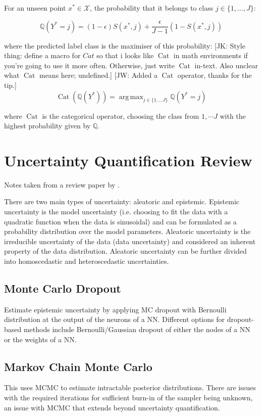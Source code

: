 \documentclass[twoside,11pt]{article}
\newcommand{\jk}[1]{{\color{blue} [JK: #1]}}
\newcommand{\jw}[1]{{\color{gray} [JW: #1]}}
\newcommand{\Cat}{\operatorname{Cat}}
\DeclareMathOperator*{\argmax}{arg\,max}
\begin{document}
For an unseen point $x^* \in \mathcal{X}$, the probability that it belongs to class $j \in \{1, \dots, J\}$:

\[\mathbb{Q}(Y^* = j) = (1-\epsilon) S(x^*, j) + \frac{\epsilon}{J-1}(1-S(x^*, j))\]

where the predicted label class is the maximiser  of this probability:
%
\jk{Style thing: define a macro for $Cat$ so that i looks like  $\operatorname{Cat}$ in math environments if you're going to use it more often. Otherwise, just write $\operatorname{Cat}$ in-text. Also unclear what $\operatorname{Cat}$ means here; undefined.}
\jw{Added a $\Cat$ operator, thanks for the tip.}
%
\[\Cat(\mathbb{Q}(Y^*)) = \argmax_{j \in \{1, \dots J\}} \mathbb{Q}(Y^* = j)\]

where $\Cat$ is the categorical operator, choosing the class from $1, \cdots J$ with the highest probability given by $\mathbb{Q}$.

\section{Uncertainty Quantification Review}\label{sec:uncertainty-quantification-review}
Notes taken from a review paper by \cite{abdar2021review}.

There are two main types of uncertainty: aleatoric and epistemic.
Epistemic uncertainty is the model uncertainty (i.e. choosing to fit the data with a quadratic function when the data is sinusoidal) and can be formulated as a probability distribution over the model parameters.
Aleatoric uncertainty is the irreducible uncertainty of the data (data uncertainty) and considered an inherent property of the data distribution.
Aleatoric uncertainty can be further divided into homoscedastic and heteroscedastic uncertainties.

\subsection{Monte Carlo Dropout}\label{subsec:monte-carlo-dropout}
Estimate epistemic uncertainty by applying MC dropout with Bernoulli distribution at the output of the neurons of a NN.
Different options for dropout-based methods include Bernoulli/Gaussian dropout of either the nodes of a NN or the weights of a NN.

\subsection{Markov Chain Monte Carlo}\label{subsec:markov-chain-monte-carlo}
This uses MCMC to estimate intractable posterior distributions.
There are issues with the required iterations for sufficient burn-in of the sampler being unknown, an issue with MCMC that extends beyond uncertainty quantification.
\end{document}
